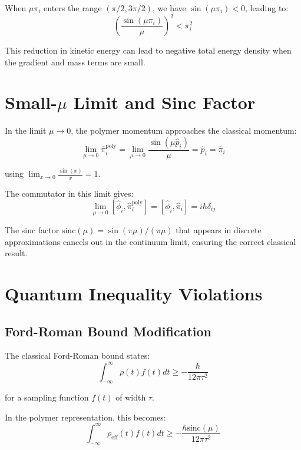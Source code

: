 \documentclass[12pt]{article}
\begin{document}
When $\mu \pi_i$ enters the range $(\pi/2, 3\pi/2)$, we have $\sin(\mu \pi_i) < 0$, leading to:
\begin{equation}
\left(\frac{\sin(\mu \pi_i)}{\mu}\right)^2 < \pi_i^2
\end{equation}

This reduction in kinetic energy can lead to negative total energy density when the gradient and mass terms are small.

\section{Small-$\mu$ Limit and Sinc Factor}

In the limit $\mu \to 0$, the polymer momentum approaches the classical momentum:
\begin{equation}
\lim_{\mu \to 0} \hat{\pi}_i^{\text{poly}} = \lim_{\mu \to 0} \frac{\sin(\mu \hat{p}_i)}{\mu} = \hat{p}_i = \hat{\pi}_i
\end{equation}

using $\lim_{x \to 0} \frac{\sin(x)}{x} = 1$.

The commutator in this limit gives:
\begin{equation}
\lim_{\mu \to 0} [\hat{\phi}_i, \hat{\pi}_i^{\text{poly}}] = [\hat{\phi}_i, \hat{\pi}_i] = i\hbar\delta_{ij}
\end{equation}

The sinc factor $\text{sinc}(\mu) = \sin(\pi\mu)/(\pi\mu)$ that appears in discrete approximations cancels out in the continuum limit, ensuring the correct classical result.

\section{Quantum Inequality Violations}

\subsection{Ford-Roman Bound Modification}

The classical Ford-Roman bound states:
\begin{equation}
\int_{-\infty}^{\infty} \rho(t) f(t) dt \geq -\frac{\hbar}{12\pi \tau^2}
\end{equation}

for a sampling function $f(t)$ of width $\tau$.

In the polymer representation, this becomes:
\begin{equation}
\int_{-\infty}^{\infty} \rho_{\text{eff}}(t) f(t) dt \geq -\frac{\hbar \text{sinc}(\mu)}{12\pi \tau^2}
\end{equation}
\end{document}
